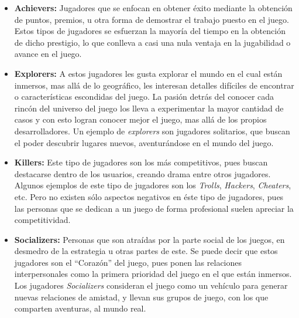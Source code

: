 \begin{itemize}
    \item {\bf Achievers:}
        Jugadores que se enfocan en obtener éxito mediante la obtención de puntos,
        premios, u otra forma de demostrar el trabajo puesto en el juego.
        Estos tipos de jugadores se esfuerzan la mayoría del tiempo en la obtención
        de dicho prestigio, lo que conlleva a casi una nula ventaja en la
        jugabilidad o avance en el juego.

    \item {\bf Explorers:}
        A estos jugadores les gusta explorar el mundo en el cual están inmersos,
        mas allá de lo geográfico, les interesan detalles difíciles de encontrar o
        características escondidas del juego.
        La pasión detrás del conocer cada rincón del universo del juego los lleva
        a experimentar la mayor cantidad de casos y con esto logran conocer mejor
        el juego, mas allá de los propios desarrolladores.
        Un ejemplo de \emph{explorers} son jugadores solitarios, que buscan el
        poder descubrir lugares nuevos, aventurándose en el mundo del juego.

    \item {\bf Killers:}
        Este tipo de jugadores son los más competitivos, pues buscan destacarse
        dentro de los usuarios, creando drama entre otros jugadores.
        Algunos ejemplos de este tipo de jugadores son los \emph{Trolls},
        \emph{Hackers}, \emph{Cheaters}, etc.
        Pero no existen sólo aspectos negativos en éste tipo de jugadores,
        pues las personas que se dedican a un juego de forma profesional
        suelen apreciar la competitividad.

    \item {\bf Socializers:}
        Personas que son atraídas por la parte social de los juegos,
        en desmedro de la estrategia u otras partes de este.
        Se puede decir que estos jugadores son el ``Corazón'' del juego,
        pues ponen las relaciones interpersonales como la primera prioridad
        del juego en el que están inmersos.
        Los jugadores \emph{Socializers} consideran el juego
        como un vehículo para generar nuevas relaciones de amistad, y llevan
        sus grupos de juego, con los que comparten aventuras, al mundo real.

\end{itemize}

